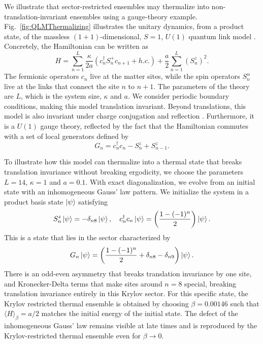 \documentclass[
 reprint,
 amsmath,amssymb,
 aps,floatfix,prl,superscriptaddress
]{revtex4-2}
\begin{document}
We illustrate that sector-restricted ensembles may thermalize into non-translation-invariant ensembles using a gauge-theory example.
Fig.~\ref{fig:QLMThermalizing} illustrates the unitary dynamics, from a product state, of  the massless
$(1+1)$-dimensional, $S=1$, $U(1)$ quantum link model \cite{Halimeh:2025vvp}. Concretely, the Hamiltonian can be written as
\begin{equation} \label{eq:1dqlm}
    H=\sum_{n=1}^L \frac{\kappa}{2a}\left(c_n^\dagger S^+_n c_{n+1} + h.c.\right) + \frac{a}{2}\sum_{n=1}^L \left(S^z_n\right)^2.
\end{equation}
The fermionic operators $c_n$ live at the matter sites, while the spin operators $S_n^\alpha$ live at the links that connect the site $n$ to $n+1$. The parameters of the theory are $L$, which is the system size, $\kappa$ and $a$. We consider periodic boundary conditions, making this model translation invariant. Beyond translations, this model is also invariant under charge conjugation and reflection \cite{Banerjee2012}. Furthermore, it is a $U(1)$ gauge theory, reflected by the fact that the Hamiltonian commutes with a set of local generators defined by 
\begin{equation}
    G_n = c^\dagger_{n} c_{n} - S^z_{n} + S^z_{n-1}.
\end{equation}

To illustrate how this model can thermalize into a thermal state that breaks translation invariance without breaking ergodicity, we choose the parameters $L=14$, $\kappa = 1$ and $a = 0.1$. With exact diagonalization, we evolve from an initial state with an inhomogeneous Gauss' law pattern. We initialize the system in a product basis state $\ket{\psi}$ satisfying
\begin{equation}
    S^z_n\ket{\psi}=-\delta_{n8}\ket{\psi},\quad c^\dagger_nc_n\ket{\psi}=\left(\frac{1-(-1)^n}{2}\right)\ket{\psi}.
\end{equation}
This is a state that lies in the sector characterized by
\begin{equation}
    G_n\ket{\psi}=\left(\frac{1-(-1)^n}{2}+\delta_{n8}-\delta_{n9}\right)\ket{\psi}.
    \label{eq:inogauss1}
\end{equation}
There is an odd-even asymmetry that breaks translation invariance by one site, and Kronecker-Delta terms that make sites around $n=8$ special, breaking translation invariance entirely in this Krylov sector.
For this specific state, the Krylov restricted thermal ensemble is obtained by choosing $\beta = 0.00146$ such that $\langle H\rangle_\beta = a/2$ matches the initial energy of the initial state. The defect of the inhomogeneous Gauss' law remains visible at late times and is reproduced by the Krylov-restricted thermal ensemble even for $\beta \to 0$. 
\end{document}
